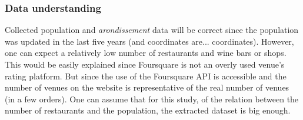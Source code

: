 \documentclass[english]{article}
\begin{document}
	\subsubsection{Data understanding}
	Collected population and \textit{arondissement} data will be correct since the population was updated in the last five years (and coordinates are... coordinates). However, one can expect a relatively low number of restaurants and wine bars or shops. This would be easily explained since Foursquare is not an overly used venue's rating platform. But since the use of the Foursquare API is accessible and the number of venues on the website is representative of the real number of venues (in a few orders). One can assume that for this study, of the relation between the number of restaurants and the population, the extracted dataset is big enough.	
\end{document}
